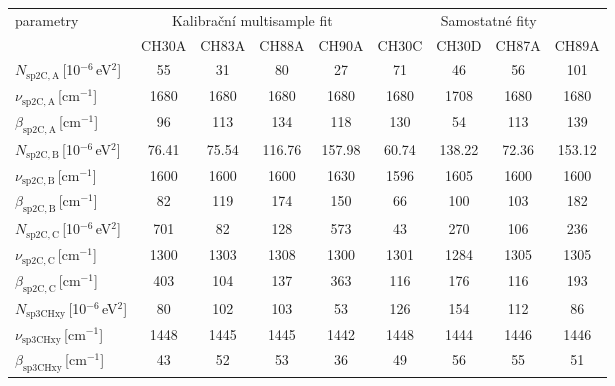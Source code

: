 \begin{tabular}{lcccccccc}
\hline
parametry & \multicolumn{4}{c}{Kalibrační multisample fit} & \multicolumn{4}{c}{Samostatné fity}\\
 & CH30A & CH83A & CH88A & CH90A & CH30C & CH30D & CH87A & CH89A\\
\hline
$N_\mathrm{sp2C,A}$\,[10$^{-6}$\,eV$^2$] & 55 & 31 & 80 & 27 & 71 & 46 & 56 & 101\\
$\nu_\mathrm{sp2C,A}$\,[cm$^{-1}$] & 1680 & 1680 & 1680 & 1680 & 1680 & 1708 & 1680 & 1680\\
$\beta_\mathrm{sp2C,A}$\,[cm$^{-1}$] & 96 & 113 & 134 & 118 & 130 & 54 & 113 & 139\\
$N_\mathrm{sp2C,B}$\,[10$^{-6}$\,eV$^2$] & 76.41 & 75.54 & 116.76 & 157.98 & 60.74 & 138.22 & 72.36 & 153.12\\
$\nu_\mathrm{sp2C,B}$\,[cm$^{-1}$] & 1600 & 1600 & 1600 & 1630 & 1596 & 1605 & 1600 & 1600\\
$\beta_\mathrm{sp2C,B}$\,[cm$^{-1}$] & 82 & 119 & 174 & 150 & 66 & 100 & 103 & 182\\
$N_\mathrm{sp2C,C}$\,[10$^{-6}$\,eV$^2$] & 701 & 82 & 128 & 573 & 43 & 270 & 106 & 236\\
$\nu_\mathrm{sp2C,C}$\,[cm$^{-1}$] & 1300 & 1303 & 1308 & 1300 & 1301 & 1284 & 1305 & 1305\\
$\beta_\mathrm{sp2C,C}$\,[cm$^{-1}$] & 403 & 104 & 137 & 363 & 116 & 176 & 116 & 193\\
$N_\mathrm{sp3CHxy}$\,[10$^{-6}$\,eV$^2$] & 80 & 102 & 103 & 53 & 126 & 154 & 112 & 86\\
$\nu_\mathrm{sp3CHxy}$\,[cm$^{-1}$] & 1448 & 1445 & 1445 & 1442 & 1448 & 1444 & 1446 & 1446\\
$\beta_\mathrm{sp3CHxy}$\,[cm$^{-1}$] & 43 & 52 & 53 & 36 & 49 & 56 & 55 & 51\\
\hline
\end{tabular}
